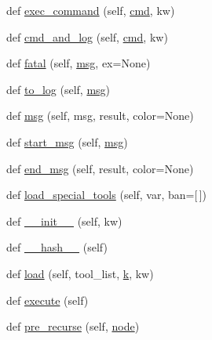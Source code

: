 \begin{DoxyCompactItemize}
def \hyperlink{classwaflib_1_1_context_1_1_context_aaa7d209a0d05f2f8e45fc11b83c72dba}{exec\+\_\+command} (self, \hyperlink{sndfile__play_8m_adfc5ba7e22f5e4a6221c12a70503bef3}{cmd}, kw)
\item 
def \hyperlink{classwaflib_1_1_context_1_1_context_aaa63c5a7ac60f1bf164febe6642d270f}{cmd\+\_\+and\+\_\+log} (self, \hyperlink{sndfile__play_8m_adfc5ba7e22f5e4a6221c12a70503bef3}{cmd}, kw)
\item 
def \hyperlink{classwaflib_1_1_context_1_1_context_a42739307965d7ef470985d7bb7408788}{fatal} (self, \hyperlink{classwaflib_1_1_context_1_1_context_a7495a2e04e528aa54bda3cadf08240cb}{msg}, ex=None)
\item 
def \hyperlink{classwaflib_1_1_context_1_1_context_a596fa2d8dc5a61602101f43ec1eb3e7e}{to\+\_\+log} (self, \hyperlink{classwaflib_1_1_context_1_1_context_a7495a2e04e528aa54bda3cadf08240cb}{msg})
\item 
def \hyperlink{classwaflib_1_1_context_1_1_context_a7495a2e04e528aa54bda3cadf08240cb}{msg} (self, msg, result, color=None)
\item 
def \hyperlink{classwaflib_1_1_context_1_1_context_a344a0dff2c7b0d2d76057d55b83c3f16}{start\+\_\+msg} (self, \hyperlink{classwaflib_1_1_context_1_1_context_a7495a2e04e528aa54bda3cadf08240cb}{msg})
\item 
def \hyperlink{classwaflib_1_1_context_1_1_context_a6340799a7fa4dc1230d13b7c08eec789}{end\+\_\+msg} (self, result, color=None)
\item 
def \hyperlink{classwaflib_1_1_context_1_1_context_a95a53e6c363450df77f847bec6c56696}{load\+\_\+special\+\_\+tools} (self, var, ban=\mbox{[}$\,$\mbox{]})
\item 
def \hyperlink{classwaflib_1_1_context_1_1_context_ab8fabf802b21a8a8e77c3e3811c58c84}{\+\_\+\+\_\+init\+\_\+\+\_\+} (self, kw)
\item 
def \hyperlink{classwaflib_1_1_context_1_1_context_ae8096e428213ed965d8cd5629c2481a1}{\+\_\+\+\_\+hash\+\_\+\+\_\+} (self)
\item 
def \hyperlink{classwaflib_1_1_context_1_1_context_ad214db6a7b3ce05051972f7d073a74f2}{load} (self, tool\+\_\+list, \hyperlink{rfft2d_test_m_l_8m_adc468c70fb574ebd07287b38d0d0676d}{k}, kw)
\item 
def \hyperlink{classwaflib_1_1_context_1_1_context_ae98aa77cb954743799c5b730c6775329}{execute} (self)
\item 
def \hyperlink{classwaflib_1_1_context_1_1_context_a290c81ad18ad9b3c0bcbde2d8fce519e}{pre\+\_\+recurse} (self, \hyperlink{structnode}{node})

\end{DoxyCompactItemize}
